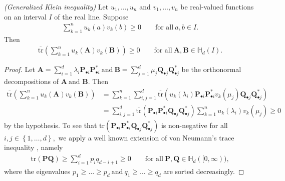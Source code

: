 \begin{proposition}
  \emph{(Generalized Klein inequality)}
  Let 
  $
    u_1, \ldots, u_n
  $
  and
  $
    v_1, \ldots, v_n
  $
  be real-valued functions on an interval $I$
  of the real line.
  Suppose
  \begin{gather}
    \sum_{k=1}^{n}
    u_k(a)
    v_k(b)
    \ge
    0
    \qquad
    \text{for all}
    \ 
    a,b \in I
    .
  \end{gather}
  Then
  \begin{gather}
    \overline{\mathrm{tr}}
    \left( 
    \sum_{k=1}^{n}
    u_k(\mathbf{A})
    v_k(\mathbf{B})
    \right)
    \ge 0
    \qquad
    \text{for all}
    \ 
    \mathbf{A}, \mathbf{B} \in \mathbb{H}_d(I)
    .
  \end{gather}
\end{proposition}
\begin{proof}
  \emph{\cite[Proposition~3]{Petz1994}}
  Let 
  $
  \mathbf{A} 
    =
    \sum_{i=1}^{d} 
    \lambda_i
    \mathbf{P}_{\bullet i}
    \mathbf{P}_{\bullet i}^*
    \ 
    \text{and}
    \ 
    \mathbf{B} 
    =
    \sum_{j=1}^{d} 
    \mu_j
    \mathbf{Q}_{\bullet j}
    \mathbf{Q}_{\bullet j}^*
  $
  be the orthonormal decompositions of 
  $
    \mathbf{A}
    \ \text{and }
    \mathbf{B}
    .
  $
  Then
  \begin{align}
    \overline{\mathrm{tr}}
    \left( 
    \sum_{k=1}^{n}
    u_k(\mathbf{A})
    v_k(\mathbf{B})
    \right)
    &=
    \sum_{k=1}^{n}
    \sum_{i,j=1}^{d} 
    \overline{\mathrm{tr}}
    \left( 
    u_k(\lambda_i)
    \mathbf{P}_{\bullet i}
    \mathbf{P}_{\bullet i}^*
    v_k(\mu_j)
    \mathbf{Q}_{\bullet j}
    \mathbf{Q}_{\bullet j}^*
    \right)
    \\
    &=
    \sum_{i,j=1}^{d} 
    \overline{\mathrm{tr}}
    \left( 
    \mathbf{P}_{\bullet i}
    \mathbf{P}_{\bullet i}^*
    \mathbf{Q}_{\bullet j}
    \mathbf{Q}_{\bullet j}^*
    \right)
    \sum_{k=1}^{n}
    u_k(\lambda_i)
    v_k(\mu_j)
    \ge
    0
  \end{align}
  by the hypothesis.
  To see that 
  $
  \mathrm{tr}
    \left( 
    \mathbf{P}_{\bullet i}
    \mathbf{P}_{\bullet i}^*
    \mathbf{Q}_{\bullet j}
    \mathbf{Q}_{\bullet j}^*
    \right)
  $
  is non-negative for all $i,j \in \left\{ 1,\ldots,d \right\},$
  we apply a well known extension of von Neumann's trace inequality 
  \cite[Lemma~1]{Ruhe1970},
  namely
  \begin{gather}
    \mathrm{tr}
    (\mathbf{P}\mathbf{Q})
    \ge
    \sum_{i=1}^{d} 
    p_i q_{d-i+1}
    \ge
    0
    \qquad
    \text{for all}
    \ 
    \mathbf{P}
    ,
    \mathbf{Q}
    \in
    \mathbb{H}_d([0,\infty))
    ,
  \end{gather}
  where the eigenvalues
  $
    p_1\ge \ldots \ge p_d
    \ 
    \text{and}
    \ 
    q_1\ge \ldots \ge q_d
  $
  are sorted decreasingly.
\end{proof}




